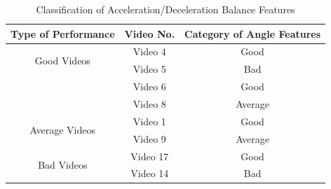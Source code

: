 \begin{table}
  \centering
  \begin{tabular}{|c|c|c|}
    \hline
    Type of Performance & Video No. & Category of Angle Features   \\
        \hline
        \hline
        \multirow{2}{*}{Good Videos} 
          & Video 4 &  Good \\ \cline{2-3}
          & Video 5 &  Bad \\ \cline{2-3}
          & Video 6 &  Good \\ \cline{2-3}
          & Video 8 &  Average \\ \cline{2-3}
          \hline

          \multirow{2}{*}{Average Videos} 
          & Video 1 &  Good  \\ \cline{2-3}
          & Video 9 &  Average  \\ \cline{2-3}
          \hline

          \multirow{2}{*}{Bad Videos} 
          & Video 17 &  Good  \\ \cline{2-3}
          & Video 14 &  Bad  \\ \cline{2-3}
          \hline
  \end{tabular}
\caption{Classification of Acceleration/Deceleration Balance Features}
\label{table:AccDecClassification}
\end{table}

